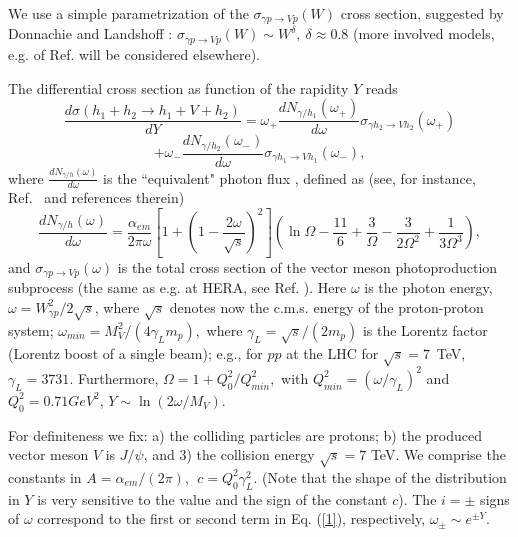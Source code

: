 \documentclass[12pt]{article}
\begin{document}
We use a simple parametrization of the $\sigma_{\gamma p\rightarrow Vp}(W)$ cross section, 
suggested by Donnachie and Landshoff \cite{DL}: $\sigma_{\gamma p\rightarrow Vp}(W)\sim W^{\delta},\ \delta\approx 0.8$ (more involved models, e.g. of Ref. \cite{FFJS, Capua} will be considered elsewhere).

The differential cross section as function of the rapidity $Y$ reads
 $$
\frac{d\sigma (h_1+h_2\rightarrow h_1+V+h_2)}{dY}=\omega_+\frac{dN_{\gamma/h_1}(\omega_+)}{d\omega}\sigma_{\gamma h_2\rightarrow Vh_2}(\omega_+)
$$
\begin{equation}\label{1}
+\omega_-\frac{dN_{\gamma/h_2}(\omega_-)}{d\omega}\sigma_{\gamma h_1\rightarrow Vh_1}(\omega_-),
\end{equation}
where $\frac{dN_{\gamma/h}(\omega)}{d\omega}$ is the ``equivalent" photon flux \cite{Review}, defined as (see, for instance, Ref.~\cite{Brazil} and references therein) 
\begin{equation}
\frac{dN_{\gamma/h}(\omega)}{d\omega} = \frac{\alpha_{em}}{2\pi\omega}[1+(1-\frac{2\omega}{\sqrt{s}})^2]
(\ln\Omega-\frac{11}{6}+\frac{3}{\Omega}-\frac{3}{2\Omega^2}+\frac{1}{3\Omega^3}),
\label{photon_flux}
\end{equation}
and $\sigma_{\gamma p\rightarrow Vp}(\omega)$ is the total cross section of the vector meson photoproduction subprocess (the same as e.g. at HERA, see Ref. \cite{Capua}). 
Here $\omega$ is the photon energy, $\omega=W^2_{\gamma p}/2\sqrt s$, where $\sqrt s$ denotes now the c.m.s. energy of the  proton-proton system; 
$\omega_{min}=M_V^2/(4\gamma_Lm_p),$ where $\gamma_L=\sqrt s/(2m_p)$
is the Lorentz factor (Lorentz boost of a single beam); e.g., for $pp$ at the LHC for $\sqrt{s}=7$~TeV,
$\gamma_L=3731$.
Furthermore,
$\Omega=1+Q_0^2/Q_{min}^2,$ with  $Q_{min}^2=(\omega/\gamma_L)^2$ and  $Q_0^2=0.71 GeV^2$,  
$Y\sim\ln(2\omega/M_V)$.  

For definiteness we fix: a) the colliding particles are protons;
b) the produced vector meson $V$ is $J/\psi$, and 3) the collision energy $\sqrt s=7$ TeV.
We comprise the constants in $A=\alpha_{em}/(2\pi),\ \  c=Q_0^2\gamma_L^2$.
(Note that the shape of the distribution in $Y$ is very sensitive to the value and the sign of the constant $c$).
The $i=\pm$ signs of $\omega$ correspond to the first or second term in Eq. (\ref{1}), respectively, $\omega_{\pm}\sim e^{\pm Y}$.
\end{document}
